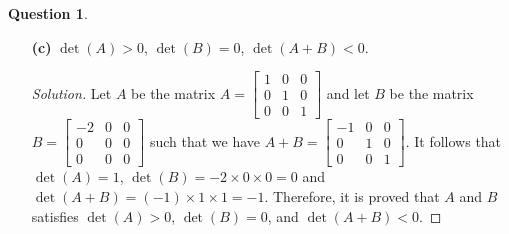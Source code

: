 \documentclass{article}
\theoremstyle{definition}
\newtheorem{question}{Question}
\begin{document}
\begin{question}
\begin{enumerate}
\begin{proof}[Solution]
    Let \(A\) be the matrix \(A=
    \begin{bmatrix}
        1 & 0 & 0 \\
        0 & 1 & 0 \\
        0 & 0 & 1
    \end{bmatrix}\)
    and let \(B\) be the matrix \(B=
    \begin{bmatrix}
        1 & 0 & 0 \\
        0 & -1 & 0 \\
        0 & 0 & -1
    \end{bmatrix}\) so that we have \(A+B=
    \begin{bmatrix}
        2 & 0 & 0 \\
        0 & 0 & 0 \\
        0 & 0 & 0
    \end{bmatrix}\). Then we have \(A=I\) so that \(\det(A)=\det(I)=1\),
    \(\det(B)=1\times(-1)\times(-1)=1\), and \(\det(A+B)=2\times0\times0=0\).
    Therefore, it is proved that \(A\) and \(B\) satisfies \(\det(A)>0\),
    \(\det(B)>0\), and \(\det(A+B)=0\).
\end{proof}

\vspace{.25cm}

\item[\textbf{(c)}] $\det(A) > 0$, $\det(B) = 0$, $\det(A+B) < 0$.

\begin{proof}[Solution]
    Let \(A\) be the matrix \(A=
    \begin{bmatrix}
        1 & 0 & 0 \\
        0 & 1 & 0 \\
        0 & 0 & 1
    \end{bmatrix}\)
    and let \(B\) be the matrix \(B=
    \begin{bmatrix}
        -2 & 0 & 0 \\
        0 & 0 & 0 \\
        0 & 0 & 0
    \end{bmatrix}\) such that we have \(A+B=
    \begin{bmatrix}
        -1 & 0 & 0 \\
        0 & 1 & 0 \\
        0 & 0 & 1
    \end{bmatrix}\). It follows that \(\det(A)=1\), \(\det(B)=-2\times0\times0=0\)
    and \(\det(A+B)=(-1)\times1\times1=-1\). Therefore, it is proved that
    \(A\) and \(B\) satisfies \(\det(A)>0\), \(\det(B)=0\), and \(\det(A+B)<0\).
\end{proof}


\end{enumerate}
\end{question}
\end{document}
